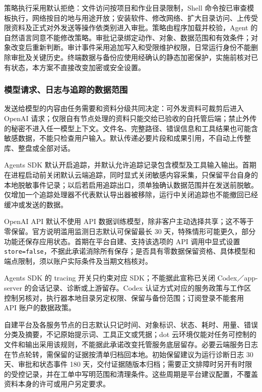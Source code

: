 \documentclass[11pt,a4paper]{article}
\begin{document}
策略执行采用默认拒绝：文件访问按项目和作业目录限制，Shell 命令按已审查模板执行，网络按目的地与用途开放；安装软件、修改网络、扩大目录访问、上传受限资料及正式对外发送等操作依类别进入审批。策略由程序加载并校验，Agent 的自然语言同意不能修改策略。审批记录绑定动作、对象、数据范围和有效条件；对象改变后重新判断。审计事件采用追加写入和受限维护权限，日常运行身份不能删除审批及关键历史。终端数据与备份应使用经确认的静态加密保护，实施前核对已有状态，本方案不直接改变加密或安全设置。

\subsubsection{模型请求、日志与追踪的数据范围}

发送给模型的内容由任务需要和资料分级共同决定：可外发资料可裁剪后进入 OpenAI 请求；仅限自有节点处理的资料只能交给已验收的自托管后端；禁止外传的秘密不进入任一模型上下文。文件名、完整路径、错误信息和工具结果也可能含敏感数据，不能只检查用户输入。默认传递必要片段和成果引用，不自动上传整库、整盘或全部对话。

Agents SDK 默认开启追踪，并默认允许追踪记录包含模型及工具输入输出。首期在进程启动前关闭默认云端追踪，同时显式关闭敏感内容采集，只保留平台自身的本地脱敏事件记录；以后若启用追踪出口，须单独确认数据范围并在发送前脱敏。仅增加一个追踪处理器不代表默认导出器被移除，运行中关闭追踪也不能撤回已经缓冲或发送的数据。\cite{ops-agents-tracing}

OpenAI API 默认不使用 API 数据训练模型，除非客户主动选择共享；这不等于零保留。官方说明滥用监测日志默认可保留最长 30 天，特殊情形可能更久，部分功能还保存应用状态。首期在平台自建、支持该选项的 API 调用中显式设置 \texttt{store=false}，不据此承诺消除所有保存；是否具有零数据保留资格、具体模型和端点限制，须以账户实际条件及当期文档核对。\cite{ops-openai-data}

Agents SDK 的 tracing 开关只约束对应 SDK；不能据此宣称已关闭 Codex／app-server 的会话记录、诊断或上游留存。Codex 认证方式对应的服务政策与工作区控制另核对，执行器本地目录另定权限、保留与备份范围；订阅登录不能套用 API 账户的数据政策。\cite{v121-codex-auth}

自建平台及各服务节点的日志默认只记时间、对象标识、状态、耗时、用量、错误分类及摘要，不记原始提示词、工具正文或凭据；dot 云环境仅能对任务可控制的文件和输出采用该规则，不能据此承诺改变托管服务底层留存。必要云端服务日志在节点轮转，需保留的证据按清单归档回本地。初始保留建议为运行诊断日志 30 天、审批和状态事件 180 天，交付证据随版本归档；需要正文排障时另开有时限的受控记录，并在工单中写明范围和清理条件。这些周期是平台建议配置，不覆盖资料本身的许可或用户另定要求。
\end{document}
